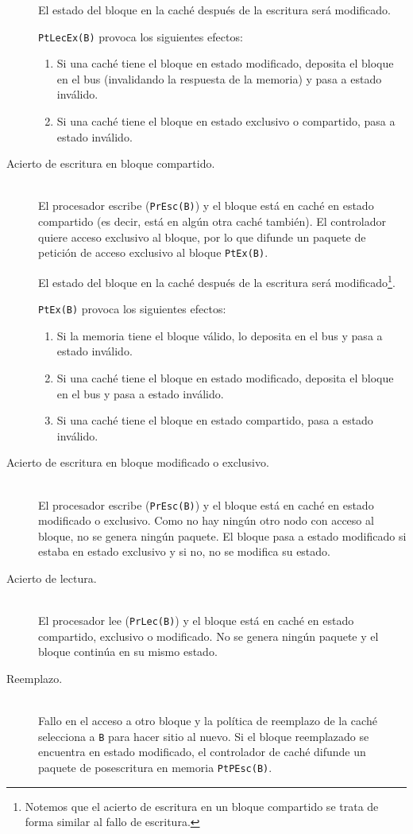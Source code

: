 \begin{description}
    El estado del bloque en la caché después de la escritura será modificado.

    \verb|PtLecEx(B)| provoca los siguientes efectos:
    \begin{enumerate}
        \item Si una caché tiene el bloque en estado modificado, deposita el bloque en el bus (invalidando la respuesta de la memoria) y pasa a estado inválido.
        \item Si una caché tiene el bloque en estado exclusivo o compartido, pasa a estado inválido.
    \end{enumerate}

    \item [Acierto de escritura en bloque compartido.]~\\
    El procesador escribe (\verb|PrEsc(B)|) y el bloque está en caché en estado compartido (es decir, está en algún otra caché también). El controlador quiere acceso exclusivo al bloque, por lo que difunde un paquete de petición de acceso exclusivo al bloque \verb|PtEx(B)|.

    El estado del bloque en la caché después de la escritura será modificado\footnote{Notemos que el acierto de escritura en un bloque compartido se trata de forma similar al fallo de escritura.}.

    \verb|PtEx(B)| provoca los siguientes efectos:
    \begin{enumerate}
        \item Si la memoria tiene el bloque válido, lo deposita en el bus y pasa a estado inválido.
        \item Si una caché tiene el bloque en estado modificado, deposita el bloque en el bus y pasa a estado inválido.
        \item Si una caché tiene el bloque en estado compartido, pasa a estado inválido.
    \end{enumerate}
    \item [Acierto de escritura en bloque modificado o exclusivo.]~\\
        El procesador escribe (\verb|PrEsc(B)|) y el bloque está en caché en estado modificado o exclusivo. Como no hay ningún otro nodo con acceso al bloque, no se genera ningún paquete. El bloque pasa a estado modificado si estaba en estado exclusivo y si no, no se modifica su estado.
    \item [Acierto de lectura.]~\\
        El procesador lee (\verb|PrLec(B)|) y el bloque está en caché en estado compartido, exclusivo o modificado. No se genera ningún paquete y el bloque continúa en su mismo estado.
    \item [Reemplazo.]~\\
        Fallo en el acceso a otro bloque y la política de reemplazo de la caché selecciona a \verb|B| para hacer sitio al nuevo. Si el bloque reemplazado se encuentra en estado modificado, el controlador de caché difunde un paquete de posescritura en memoria \verb|PtPEsc(B)|. 


\end{description}
